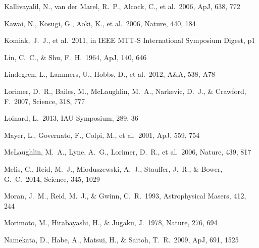 \begin{thebibliography}{99}
\begin{multicols}{2}
{%

 Kallivayalil, N., van der Marel, R.~P., Alcock, C., et al.\ 2006, ApJ, 638, 772 

 Kawai, N., Kosugi, G., Aoki, K., et al.\ 2006, Nature, 440, 184

Komiak,~J.~J., et al.\ 2011, in IEEE MTT-S International Symposium Digest, p1


 Lin, C.~C., \& Shu, F.~H.\ 1964, ApJ, 140, 646 

 Lindegren, L., Lammers, U., Hobbs, D., et al.\ 2012, A\&A, 538, A78 

 Lorimer, D.~R., Bailes, M., McLaughlin, M.~A., Narkevic, D.~J., 
\& Crawford, F.\ 2007, Science, 318, 777 

 Loinard, L.\ 2013, IAU Symposium, 289, 36 

 Mayer, L., Governato, F., Colpi, M., et al.\ 2001, ApJ, 559, 754 

 McLaughlin, M.~A., Lyne, A.~G., Lorimer, D.~R., et al.\ 2006, Nature, 439, 817 

Melis, C., Reid, M.~J., Mioduszewski, A.~J., Stauffer, J.~R., \& Bower, G.~C.\ 2014, Science, 345, 1029 

 Moran, J.~M., Reid, 
M.~J., \& Gwinn, C.~R.\ 1993, Astrophysical Masers, 412, 244 

 Morimoto, M., Hirabayashi, H., \& Jugaku, J.\ 1978, Nature, 276, 694 


 Namekata, D., Habe, A., Matsui, H., \& Saitoh, T.~R.\ 2009, ApJ, 691, 1525

}
\end{multicols}
\end{thebibliography}
